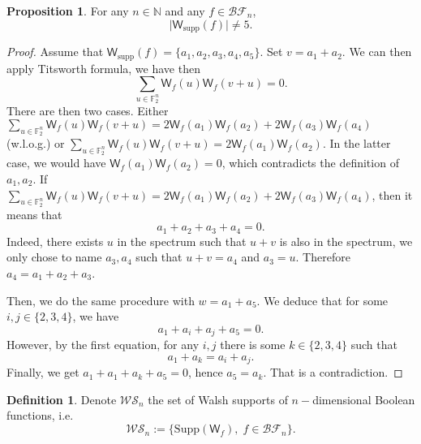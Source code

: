 \documentclass[12pt]{article}
\theoremstyle{definition}
\newtheorem{definition}[theorem]{Definition}
\newtheorem{proposition}[theorem]{Proposition}
\newcommand{\F}{\mathbb{F}}
\newcommand{\W}{\mathsf{W}}
\begin{document}
\begin{proposition} For any \(n\in\mathbb{N}\) and any \(f\in\mathcal{BF}_n\), 
    \begin{equation*}
        \lvert \W_{\mathrm{supp}}(f) \rvert \neq 5.
    \end{equation*}
\end{proposition}
\begin{proof}
    Assume that \( \W_{\mathrm{supp}}(f) = \{a_1,a_2,a_3,a_4,a_5\}\). Set \(v = a_1+a_2\).
    We can then apply Titsworth formula, we have then
    \begin{equation*}
        \sum_{u\in \F_2^n} \W_f(u)\W_f(v+u) = 0.
    \end{equation*}
    There are then two cases. Either \(\sum_{u\in \F_2^n} \W_f(u)\W_f(v+u) = 2\W_f(a_1)\W_f(a_2)+2\W_f(a_3)\W_f(a_4)\) (w.l.o.g.) or 
    \(\sum_{u\in \F_2^n} \W_f(u)\W_f(v+u) = 2\W_f(a_1)\W_f(a_2)\). In the latter case, we would have \(\W_f(a_1)\W_f(a_2) = 0\), 
    which contradicts the definition of \(a_1,a_2\). If \(\sum_{u\in \F_2^n} \W_f(u)\W_f(v+u) = 2\W_f(a_1)\W_f(a_2)+2\W_f(a_3)\W_f(a_4)\), then it means that 
    \begin{equation*}
        a_1 + a_2 + a_3 + a_4 = 0.
    \end{equation*}
    Indeed, there exists \(u\) in the spectrum such that \(u+v\) is also in the spectrum, we only 
    chose to name \(a_3, a_4\) such that \(u+v = a_4\) and \(a_3 = u\). Therefore \(a_4 = a_1+a_2+a_3\). 
    
    Then, we do the same procedure with \(w=a_1+a_5\). We deduce that for some \(i,j\in\{2,3,4\}\), we have 
    \begin{equation*}
        a_1 + a_i + a_j + a_5 = 0.
    \end{equation*} 
    However, by the first equation, for any \(i,j\) there is some \(k\in\{2,3,4\}\) such that 
    \begin{equation*}
        a_1 + a_k = a_i+a_j.
    \end{equation*}
    Finally, we get \(a_1+a_1 + a_k + a_5 = 0\), hence \(a_5 = a_k\). That is a contradiction.
\end{proof}
\begin{definition} Denote \(\mathcal{WS}_n\) the set of Walsh supports of \(n-\)dimensional Boolean functions, i.e.
    \begin{equation*}
        \mathcal{WS}_n := \{\mathrm{Supp}(\W_f),\; f\in \mathcal{BF}_n\}.
    \end{equation*}
\end{definition}
\end{document}
